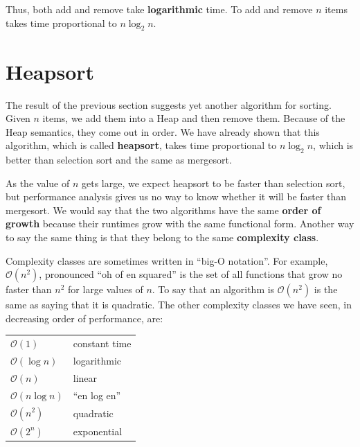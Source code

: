 \documentclass[12pt]{book}
\theoremstyle{exercise}
\begin{document}

Thus, both add and remove take {\bf logarithmic} time.
To add and remove $n$ items takes time proportional to
$n \log_2 n$.


\section{Heapsort}

The result of the previous section suggests yet another algorithm
for sorting.  Given $n$ items, we add them into a Heap and
then remove them.  Because of the Heap semantics, they come
out in order.  We have already shown that this algorithm, which
is called {\bf heapsort}, takes time proportional to $n \log_2 n$,
which is better than selection sort and the same as mergesort.

As the value of $n$ gets large, we expect heapsort to be faster
than selection sort, but performance analysis gives us no way
to know whether it will be faster than mergesort.  We would say
that the two algorithms have the same {\bf order of growth} because
their runtimes grow with the same functional form.  Another way to
say the same thing is that they belong to the same {\bf complexity
class}.


Complexity classes are sometimes written in ``big-O notation''.
For example, $\mathcal{O} (n^2)$, pronounced ``oh of
en squared'' is the set of all functions that grow no faster
than $n^2$ for large values of $n$.  To say that an algorithm
is $\mathcal{O} (n^2)$ is the same as saying that it
is quadratic.  The other complexity classes we have seen,
in decreasing order of performance, are:

\vspace {0.2in}
\begin{tabular}{ll}
$\mathcal{O} (1)$          &  constant time  \\
$\mathcal{O} (\log n)$     &  logarithmic  \\
$\mathcal{O} (n)$          &  linear  \\
$\mathcal{O} (n \log n)$   &  ``en log en''  \\
$\mathcal{O} (n^2)$        &  quadratic  \\
$\mathcal{O} (2^n)$        &  exponential
\end{tabular}
\vspace {0.2in}
\end{document}
